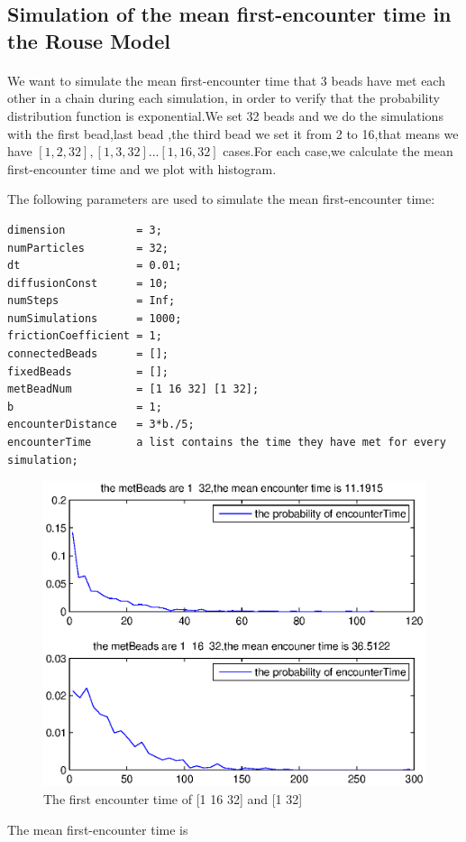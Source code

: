 \documentclass{article}
\begin{document}
\subsection{Simulation of the mean first-encounter time in the Rouse Model}
\paragraph{}
We want to simulate the mean first-encounter time that 3 beads have met each other in a chain during each simulation, in order to verify that the probability distribution function is exponential.We set 32 beads and we do the simulations with the first bead,last bead ,the third bead we set it from 2 to 16,that means we have $[1,2,32],[1,3,32]...[1,16,32]$ cases.For each case,we calculate the mean first-encounter time and we plot with histogram.

The following parameters are used to simulate the mean first-encounter time:
\pagebreak
\begin{lstlisting}
dimension           = 3;
numParticles        = 32;
dt                  = 0.01;
diffusionConst      = 10;
numSteps            = Inf;
numSimulations      = 1000;
frictionCoefficient = 1;
connectedBeads      = [];
fixedBeads          = [];
metBeadNum          = [1 16 32] [1 32];
b                   = 1;
encounterDistance   = 3*b./5;
encounterTime       a list contains the time they have met for every simulation;      
\end{lstlisting}
\begin{figure}[H]
	\includegraphics[width=6.2in]{MetTimeN.eps}
	\caption{The first encounter time of [1 16 32] and [1 32]}
\end{figure}
The mean first-encounter time is 
\end{document}
